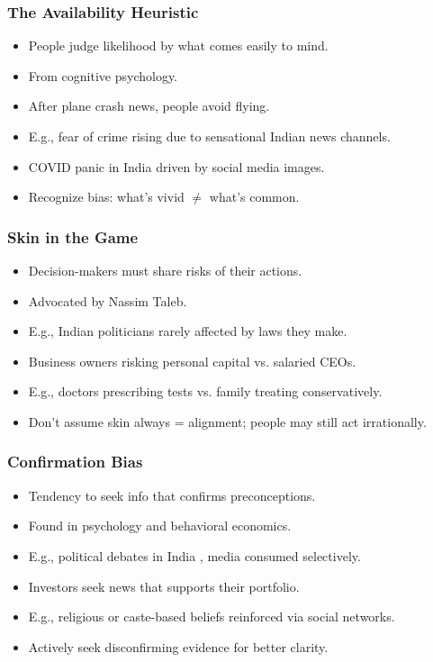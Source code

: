 \begin{frame}[fragile]\frametitle{The Availability Heuristic}
  \begin{itemize}
    \item People judge likelihood by what comes easily to mind.
    \item From cognitive psychology.
    \item After plane crash news, people avoid flying.
    \item E.g., fear of crime rising due to sensational Indian news channels.
    \item COVID panic in India driven by social media images.
    \item Recognize bias: what's vivid $\neq$ what's common.
  \end{itemize}
\end{frame}

\begin{frame}[fragile]\frametitle{Skin in the Game}
  \begin{itemize}
    \item Decision-makers must share risks of their actions.
    \item Advocated by Nassim Taleb.
    \item E.g., Indian politicians rarely affected by laws they make.
    \item Business owners risking personal capital vs. salaried CEOs.
    \item E.g., doctors prescribing tests vs. family treating conservatively.
    \item Don't assume skin always = alignment; people may still act irrationally.
  \end{itemize}
\end{frame}

\begin{frame}[fragile]\frametitle{Confirmation Bias}
  \begin{itemize}
    \item Tendency to seek info that confirms preconceptions.
    \item Found in psychology and behavioral economics.
    \item E.g., political debates in India , media consumed selectively.
    \item Investors seek news that supports their portfolio.
    \item E.g., religious or caste-based beliefs reinforced via social networks.
    \item Actively seek disconfirming evidence for better clarity.
  \end{itemize}
\end{frame}

